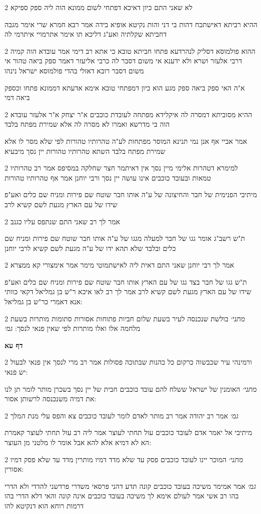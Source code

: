 \documentclass[12pt, openany]{book}
\newcommand{\sethebfont}{
\fontsize{10.5pt}{21.0pt} \selectfont
}
\newcommand{\twocol}[1]{
	{\sethebfont \begin{multicols}{2}
			#1
	\end{multicols}}	
}
\newcommand{\sectname}{}
\newcommand{\newsection}[1]{
	\addcontentsline{toc}{section}{#1}
	\renewcommand{\sectname}{#1}	
	\vspace{-\baselineskip}
	\begin{center}
		\textbf{%
\fontsize{16pt}{16pt}\selectfont
			#1}
	\end{center}
	\vspace{-\baselineskip}
	\nopagebreak
}
\begin{document}
\twocol{לא שאני התם כיון דאיכא דפתחי לשום ממונא הוה ליה ספק ספיקא
\par ההיא רביתא דאישתכח דהות בי דני והות נקיטא אופיא בידה אמר רבא חמרא שרי אימר מגבה דחביתא שקלתיה ואע"ג דליכא תו אימר אתרמויי איתרמי לה}
\twocol{ההוא פולמוסא דסליק לנהרדעא פתחו חביתא טובא כי אתא רב דימי אמר עובדא הוה קמיה דרבי אלעזר ושרא ולא ידענא אי משום דסבר לה כרבי אליעזר דאמר ספק ביאה טהור אי משום דסבר רובא דאזלי בהדי פולמוסא ישראל נינהו
\par א"ה האי ספק ביאה ספק מגע הוא כיון דמפתחי טובא אימא אדעתא דממונא פתחו וכספק ביאה דמי}
\twocol{ההיא מסוביתא דמסרה לה איקלידא מפתחה לעובדת כוכבים א"ר יצחק א"ר אלעזר עובדא הוה בי מדרשא ואמרו לא מסרה לה אלא שמירת מפתח בלבד
\par אמר אביי אף אנן נמי תנינא המוסר מפתחות לע"ה טהרותיו טהורות לפי שלא מסר לו אלא שמירת מפתח בלבד השתא טהרותיו טהורות יין נסך מיבעיא}
\twocol{למימרא דטהרות אלימי מיין נסך אין דאיתמר חצר שחלקה במסיפס אמר רב טהרותיו טמאות ובעובד כוכבים אינו עושה יין נסך ורבי יוחנן אמר אף טהרותיו טהורות
\par מיתיבי הפנימית של חבר והחיצונה של ע"ה אותו חבר שוטח שם פירות ומניח שם כלים ואע"פ שידו של עם הארץ מגעת לשם קשיא לרב}
\twocol{אמר לך רב שאני התם שנתפס עליו כגנב
\par ת"ש רשב"ג אומר גגו של חבר למעלה מגגו של ע"ה אותו חבר שוטח שם פירות ומניח שם כלים ובלבד שלא תהא ידו של ע"ה מגעת לשם קשיא לרבי יוחנן}
\twocol{אמר לך רבי יוחנן שאני התם דאית ליה לאישתמוטי מימר אמר אימצורי קא ממצרא
\par ת"ש גגו של חבר בצד גגו של עם הארץ אותו חבר שוטח שם פירות ומניח שם כלים ואע"פ שידו של עם הארץ מגעת לשם קשיא לרב אמר לך רב לאו איכא ר"ש בן גמליאל דקאי כוותי אנא דאמרי כר"ש בן גמליאל:}
\twocol{{\large\emph{מתני׳}} בולשת שנכנסה לעיר בשעת שלום חביות פתוחות אסורות סתומות מותרות בשעת מלחמה אלו ואלו מותרות לפי שאין פנאי לנסך: {\large\emph{גמ׳}} }
\newsection{דף עא}
\twocol{ורמינהי עיר שכבשוה כרקום כל כהנות שבתוכה פסולות אמר רב מרי לנסך אין פנאי לבעול יש פנאי:
\par {\large\emph{מתני׳}} האומנין של ישראל ששלח להם עובד כוכבים חבית של יין נסך בשכרן מותר לומר תן לנו את דמיה משנכנסה לרשותן אסור:}
\twocol{{\large\emph{גמ׳}} אמר רב יהודה אמר רב מותר לאדם לומר לעובד כוכבים צא והפס עלי מנת המלך
\par מיתיבי אל יאמר אדם לעובד כוכבים עול תחתי לעוצר אמר ליה רב עול תחתי לעוצר קאמרת הא לא דמיא אלא להא אבל אומר לו מלטני מן העוצר:}
\twocol{{\large\emph{מתני׳}} המוכר יינו לעובד כוכבים פסק עד שלא מדד דמיו מותרין מדד עד שלא פסק דמיו אסורין:
\par {\large\emph{גמ׳}} אמר אמימר משיכה בעובד כוכבים קונה תדע דהני פרסאי משדרי פרדשני להדדי ולא הדרי בהו רב אשי אמר לעולם אימא לך משיכה בעובד כוכבים אינה קונה והאי דלא הדרי בהו דרמות רוחא הוא דנקיטא להו}
\end{document}
